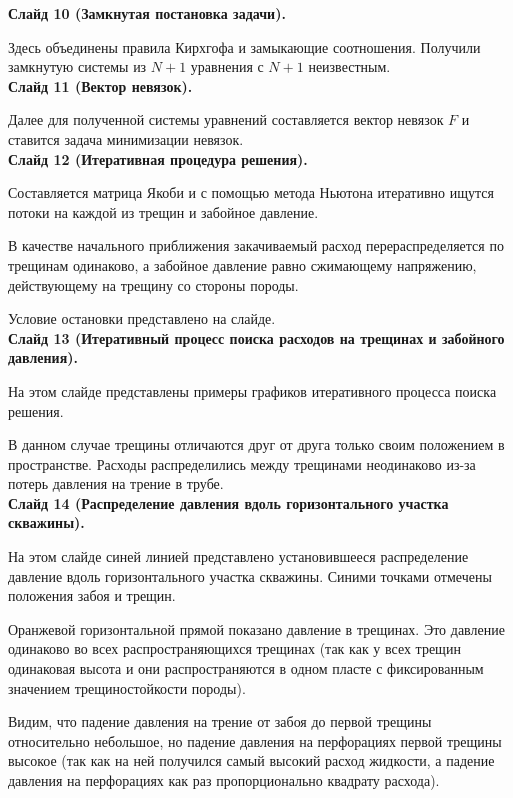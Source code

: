 \documentclass[a4paper, 12pt]{article}
\begin{document}
\textbf{Слайд 10 (Замкнутая постановка задачи).}

Здесь объединены правила Кирхгофа и замыкающие соотношения.
Получили замкнутую системы из $N+1$ уравнения с $N+1$ неизвестным.
\\

\textbf{Слайд 11 (Вектор невязок).}

Далее для полученной системы уравнений составляется вектор невязок $F$ и ставится задача минимизации невязок.\\

\textbf{Слайд 12 (Итеративная процедура решения).}

Составляется матрица Якоби и с помощью метода Ньютона итеративно ищутся потоки на каждой из трещин и забойное давление.

В качестве начального приближения закачиваемый расход перераспределяется по трещинам одинаково, а забойное давление равно сжимающему напряжению, действующему на трещину со стороны породы.

Условие остановки представлено на слайде.
\\

\textbf{Слайд 13 (Итеративный процесс поиска расходов на трещинах и забойного давления).}

На этом слайде представлены примеры графиков итеративного процесса поиска решения.

В данном случае трещины отличаются друг от друга только своим положением в пространстве.
Расходы распределились между трещинами неодинаково из-за потерь давления на трение в трубе.
\\

\textbf{Слайд 14 (Распределение давления вдоль горизонтального участка скважины).}

На этом слайде синей линией представлено установившееся распределение давление вдоль горизонтального участка скважины.
Синими точками отмечены положения забоя и трещин.

Оранжевой горизонтальной прямой показано давление в трещинах.
Это давление одинаково во всех распространяющихся трещинах (так как у всех трещин одинаковая высота и они распространяются в одном пласте с фиксированным значением трещиностойкости породы).

Видим, что падение давления на трение от забоя до первой трещины относительно небольшое, но падение давления на перфорациях первой трещины высокое (так как на ней получился самый высокий расход жидкости, а падение давления на перфорациях как раз пропорционально квадрату расхода).
\end{document}
